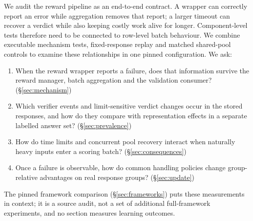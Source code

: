 \documentclass[10pt,a4paper]{article}
\begin{document}
We audit the reward pipeline as an end-to-end contract. A wrapper can
correctly report an error while aggregation removes that report; a larger
timeout can recover a verdict while also keeping costly work alive for
longer. Component-level tests therefore need to be connected to row-level
batch behaviour. We combine executable mechanism tests, fixed-response
replay and matched shared-pool controls to examine these relationships in
one pinned configuration. We ask:
\begin{enumerate}[label=\textbf{RQ\arabic*},leftmargin=*]
\item When the reward wrapper reports a failure, does that information
      survive the reward manager, batch aggregation and the validation
      consumer?
      (\S\ref{sec:mechanism})
\item Which verifier events and limit-sensitive verdict changes occur in
      the stored responses, and how do they compare with representation
      effects in a separate labelled answer set?
      (\S\ref{sec:prevalence})
\item How do time limits and concurrent pool recovery interact when
      naturally heavy inputs enter a scoring batch?
      (\S\ref{sec:consequences})
\item Once a failure is observable, how do common handling policies change
      group-relative advantages on real response groups?
      (\S\ref{sec:update})
\end{enumerate}
The pinned framework comparison (\S\ref{sec:frameworks}) puts these
measurements in context; it is a source audit, not a set of additional
full-framework experiments, and no section measures learning outcomes.
\end{document}
